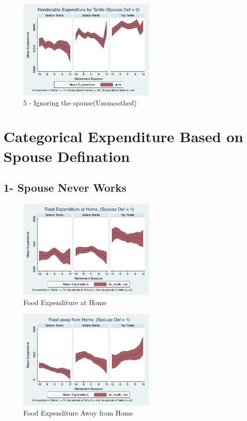 \documentclass[11pt]{article}
\begin{document}
\begin{figure}[h]
	\caption{5 - Ignoring the spouse(Unsmoothed)}
	\centering
	\includegraphics[width=0.6\textwidth]{../ConsumptionPostRetirement_by_SpouseDef/UnSmoothed/spouse_def_5.pdf}
\end{figure}

\clearpage

\section{Categorical Expenditure Based on Spouse Defination}

\subsection{1- Spouse Never Works}

\begin{figure}[h]
	\caption{Food Expenditure at Home}
	\centering
	\includegraphics[width=0.6\textwidth]{../ConsumptionPostRetirement_by_SpouseDef_Cats/Smoothed/1/spouse_def_total_foodexp_home_real.pdf}
\end{figure}


\begin{figure}[h]
	\caption{Food Expenditure Away from Home}
	\centering
	\includegraphics[width=0.6\textwidth]{../ConsumptionPostRetirement_by_SpouseDef_Cats/Smoothed/1/spouse_def_total_foodexp_away_real.pdf}
\end{figure}
\end{document}
